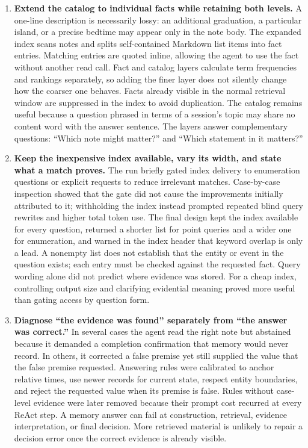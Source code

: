 \begin{enumerate}
\item \textbf{Extend the catalog to individual facts while retaining both levels.} A one-line description is necessarily lossy: an additional graduation, a particular island, or a precise bedtime may appear only in the note body. The expanded index scans notes and splits self-contained Markdown list items into fact entries. Matching entries are quoted inline, allowing the agent to use the fact without another read call. Fact and catalog layers calculate term frequencies and rankings separately, so adding the finer layer does not silently change how the coarser one behaves. Facts already visible in the normal retrieval window are suppressed in the index to avoid duplication. The catalog remains useful because a question phrased in terms of a session's topic may share no content word with the answer sentence. The layers answer complementary questions: ``Which note might matter?'' and ``Which statement in it matters?''

\item \textbf{Keep the inexpensive index available, vary its width, and state what a match proves.} The run briefly gated index delivery to enumeration questions or explicit requests to reduce irrelevant matches. Case-by-case inspection showed that the gate did not cause the improvements initially attributed to it; withholding the index instead prompted repeated blind query rewrites and higher total token use. The final design kept the index available for every question, returned a shorter list for point queries and a wider one for enumeration, and warned in the index header that keyword overlap is only a lead. A nonempty list does not establish that the entity or event in the question exists; each entry must be checked against the requested fact. Query wording alone did not predict where evidence was stored. For a cheap index, controlling output size and clarifying evidential meaning proved more useful than gating access by question form.

\item \textbf{Diagnose ``the evidence was found'' separately from ``the answer was correct.''} In several cases the agent read the right note but abstained because it demanded a completion confirmation that memory would never record. In others, it corrected a false premise yet still supplied the value that the false premise requested. Answering rules were calibrated to anchor relative times, use newer records for current state, respect entity boundaries, and reject the requested value when its premise is false. Rules without case-level evidence were later removed because their prompt cost recurred at every ReAct step. A memory answer can fail at construction, retrieval, evidence interpretation, or final decision. More retrieved material is unlikely to repair a decision error once the correct evidence is already visible.

\end{enumerate}

